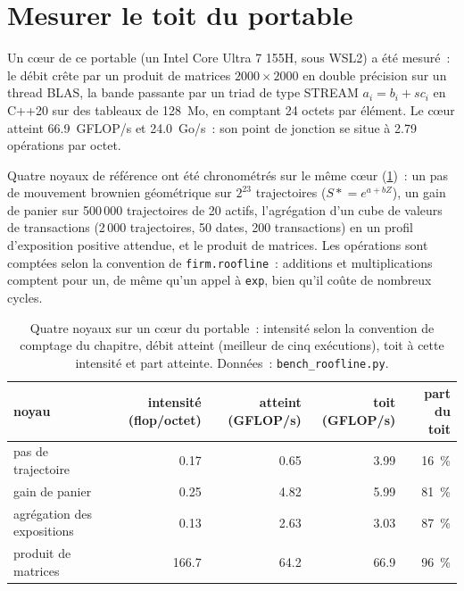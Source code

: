 \section{Mesurer le toit du portable}

Un cœur de ce portable (un Intel Core Ultra 7 155H, sous WSL2) a été mesuré~: le débit crête par un produit de matrices $2000\times2000$ en double précision
sur un thread BLAS, la bande passante par un triad de type STREAM $a_i = b_i + s c_i$ en C++20 sur des tableaux de 128~Mo, en comptant 24 octets
par élément. Le cœur atteint 66.9~GFLOP/s et 24.0~Go/s~: son point de jonction se situe à 2.79 opérations par octet.

\label{lst:pl:accelerators-for-quantitative-work:triad}

Quatre noyaux de référence ont été chronométrés sur le même cœur (\cref{tab:pl:accelerators-for-quantitative-work:kernels})~: un pas de
mouvement brownien géométrique sur $2^{23}$ trajectoires ($S \mathrel{*}= e^{a + bZ}$), un gain de panier sur 500\,000 trajectoires de 20 actifs, l'agrégation d'un
cube de valeurs de transactions (2\,000 trajectoires, 50 dates, 200 transactions) en un profil d'exposition positive attendue, et le produit de matrices. Les
opérations sont comptées selon la convention de \texttt{firm.roofline}~: additions et multiplications comptent pour un, de même qu'un appel à \texttt{exp},
bien qu'il coûte de nombreux cycles.

\begin{table}[ht]
\centering\small
\begin{tabular}{lrrrr}
\toprule
noyau & intensité (flop/octet) & atteint (GFLOP/s) & toit (GFLOP/s) & part du toit \\
\midrule
pas de trajectoire & 0.17 & 0.65 & 3.99 & 16~\% \\
gain de panier & 0.25 & 4.82 & 5.99 & 81~\% \\
agrégation des expositions & 0.13 & 2.63 & 3.03 & 87~\% \\
produit de matrices & 166.7 & 64.2 & 66.9 & 96~\% \\
\bottomrule
\end{tabular}
\caption{Quatre noyaux sur un cœur du portable~: intensité selon la convention de comptage du chapitre, débit atteint (meilleur de cinq exécutions),
toit à cette intensité et part atteinte. Données~: \texttt{bench\_roofline.py}.}
\label{tab:pl:accelerators-for-quantitative-work:kernels}
\end{table}

